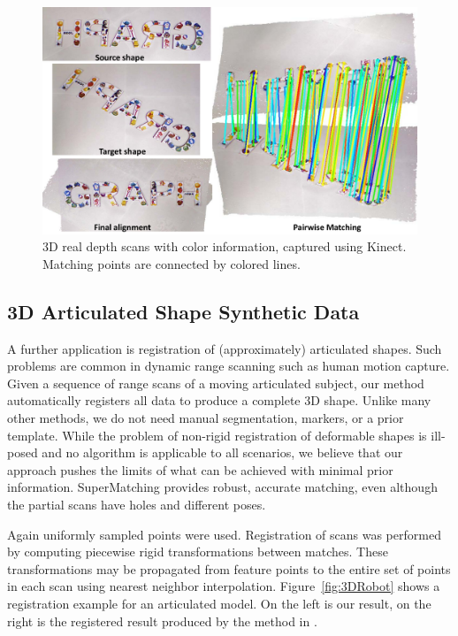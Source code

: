 \begin{figure}[h]
\centering
  \includegraphics[width=1.05\linewidth]{figures/kinect.pdf}
  \caption{3D real depth scans with color information, captured using Kinect.
    Matching points are connected by colored lines.}
\label{fig:3DReal}
\end{figure}

\subsection{3D Articulated Shape Synthetic Data}
\label{subsec:3darticulated}

A further application is registration of (approximately) articulated shapes. Such problems are common in dynamic range scanning such as human motion capture.
Given a sequence of range scans of a moving articulated subject, our method automatically registers all data to produce a complete 3D shape.
Unlike many other methods, we do not need  manual segmentation,  markers, or a prior template.
While the problem of non-rigid registration of deformable shapes is ill-posed and no algorithm is applicable to all scenarios,
we believe that our approach pushes the limits of what can be achieved with minimal prior information. SuperMatching provides robust, accurate matching,
even although the partial scans have holes and different poses.

Again uniformly sampled points were used. Registration of scans was performed by computing piecewise rigid transformations between matches.
These transformations may be propagated from feature points to the entire set of points in each scan using nearest neighbor interpolation.
Figure~\ref{fig:3DRobot} shows a registration example for an articulated model.
On the left is our result, on the right is the registered result produced by the method in \cite{Chang09}.

